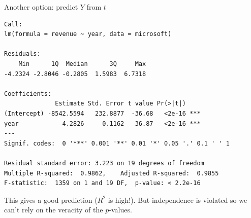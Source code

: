 \documentclass{beamer}\usepackage[]{graphicx}\usepackage[]{color}
\makeatletter
\newenvironment{kframe}{%
 \def\at@end@of@kframe{}%
 \ifinner\ifhmode%
  \def\at@end@of@kframe{\end{minipage}}%
  \begin{minipage}{\columnwidth}%
 \fi\fi%
 \def\FrameCommand##1{\hskip\@totalleftmargin \hskip-\fboxsep
 \colorbox{shadecolor}{##1}\hskip-\fboxsep
     \hskip-\linewidth \hskip-\@totalleftmargin \hskip\columnwidth}%
 \MakeFramed {\advance\hsize-\width
   \@totalleftmargin\z@ \linewidth\hsize
   \@setminipage}}%
 {\par\unskip\endMakeFramed%
 \at@end@of@kframe}
\newenvironment{knitrout}{}{} %
\makeatother
\begin{document}
\begin{darkframes}
\begin{frame}[fragile]{Another option: predict $Y$ from $t$}
\begin{knitrout}
\begin{kframe}
\begin{verbatim}
Call:
lm(formula = revenue ~ year, data = microsoft)

Residuals:
    Min      1Q  Median      3Q     Max 
-4.2324 -2.8046 -0.2805  1.5983  6.7318 

Coefficients:
              Estimate Std. Error t value Pr(>|t|)    
(Intercept) -8542.5594   232.8877  -36.68   <2e-16 ***
year            4.2826     0.1162   36.87   <2e-16 ***
---
Signif. codes:  0 '***' 0.001 '**' 0.01 '*' 0.05 '.' 0.1 ' ' 1

Residual standard error: 3.223 on 19 degrees of freedom
Multiple R-squared:  0.9862,	Adjusted R-squared:  0.9855 
F-statistic:  1359 on 1 and 19 DF,  p-value: < 2.2e-16
\end{verbatim}
\end{kframe}
\end{knitrout}
      \pause
      This gives a good prediction ($R^2$ is high!). But independence is violated so we can't rely on the veracity of the $p$-values.
    \end{frame}    
  \end{darkframes}
\end{document}
